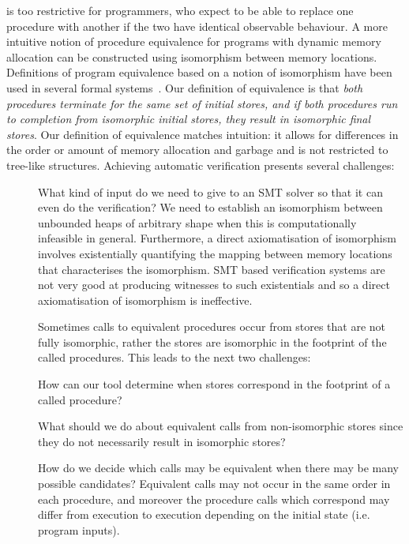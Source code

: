 \documentclass[runningheads,a4paper]{llncs}
\makeatletter
\newcommand*{\ie}{i.e.\@\xspace}
\makeatother
\begin{document}
\Symdiffequivn{} is too restrictive for programmers, who expect to be able to replace one procedure with another if the two have identical observable behaviour. A more intuitive notion of procedure equivalence for programs with dynamic memory allocation can be constructed using isomorphism between memory locations. Definitions of program equivalence based on a notion of isomorphism have been used in several formal systems~\cite{Benton2007,Pitts2002}. Our definition of equivalence is that \emph{both procedures terminate for the same set of initial stores, and if both procedures run to completion from isomorphic initial stores, they result in isomorphic final stores}. Our definition of equivalence matches intuition: it allows for differences in the order or amount of memory allocation and garbage and is not restricted to tree-like structures.
Achieving automatic verification presents several challenges:
\begin{description}
\item[\Cone{}]What kind of input do we need to give to an SMT solver so that it can even do the verification? We need to establish an isomorphism between unbounded heaps of arbitrary shape when this is computationally infeasible in general. Furthermore, a direct axiomatisation of isomorphism involves existentially quantifying the mapping between memory locations that characterises the isomorphism. SMT based verification systems are not very good at producing witnesses to such existentials and so a direct axiomatisation of isomorphism is ineffective.


Sometimes calls to equivalent procedures occur from stores that are not fully isomorphic, rather the stores are isomorphic in the footprint of the called procedures. This leads to the next two challenges:

\item[\Ctwo{}]How can our tool determine when stores correspond in the footprint of a called procedure?

\item[\Cthree{}]What should we do about equivalent calls from non-isomorphic stores since they do not necessarily result in isomorphic stores?

\item[\Cfour{}]How do we decide which calls may be equivalent when there may be many possible candidates? Equivalent calls may not occur in the same order in each procedure, and moreover the procedure calls which correspond may differ from execution to execution depending on the initial state (\ie program inputs).
\end{description}
\end{document}
